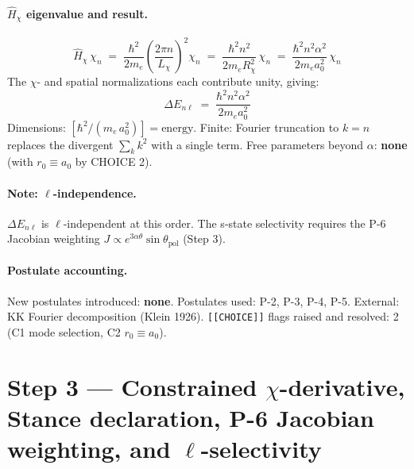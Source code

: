 \documentclass[11pt]{article}
\newcommand{\Lchi}{L_\chi}
\newcommand{\me}{m_e}
\begin{document}
\paragraph{$\hat{H}_\chi$ eigenvalue and result.}
\begin{equation}
  \hat{H}_\chi\,\chi_n
  \;=\; \frac{\hbar^2}{2\me}\!\left(\frac{2\pi n}{\Lchi}\right)^{\!2}\!\chi_n
  \;=\; \frac{\hbar^2 n^2}{2\me R_\chi^2}\,\chi_n
  \;=\; \frac{\hbar^2 n^2\alpha^2}{2\me a_0^2}\,\chi_n
  \tag{2.5}
\end{equation}
The $\chi$- and spatial normalizations each contribute unity, giving:
\begin{equation}
  \boxed{\Delta E_{n\ell}
  \;=\; \frac{\hbar^2 n^2\alpha^2}{2\me a_0^2}}
  \tag{2.6}
\end{equation}
Dimensions: $[\hbar^2/(m_e\,a_0^2)] = \mathrm{energy}$. \checkmark\quad
Finite: Fourier truncation to $k=n$ replaces the divergent $\sum_k k^2$ with a single term. \checkmark\quad
Free parameters beyond $\alpha$: \textbf{none} (with $r_0\equiv a_0$ by CHOICE 2). \checkmark

\paragraph{Note: $\ell$-independence.}
$\Delta E_{n\ell}$ is $\ell$-independent at this order.
The s-state selectivity requires the P-6 Jacobian weighting
$J\propto e^{3\alpha\theta}\sin\theta_{\mathrm{pol}}$ (Step 3).

\paragraph{Postulate accounting.}
New postulates introduced: \textbf{none}.
Postulates used: P-2, P-3, P-4, P-5.
External: KK Fourier decomposition (Klein 1926).
\texttt{[[CHOICE]]} flags raised and resolved: 2 (C1 mode selection, C2 $r_0\equiv a_0$).

\section*{Step 3 --- Constrained $\chi$-derivative, Stance declaration, P-6 Jacobian weighting,
          and $\ell$-selectivity}
\end{document}
